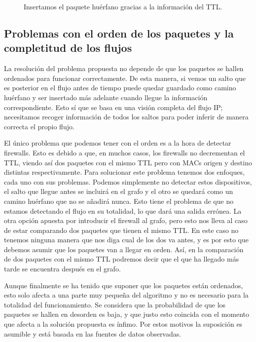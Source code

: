 \documentclass[twoside, 12pt]{epstfg}
\begin{document}
\begin{figure}[H]
\centering

\caption[Ejemplo de resolución de camino huérfano]{Insertamos el paquete huérfano gracias a la información del TTL.}
\label{fig:Analisis:OrphanPath}
\end{figure}

\subsection{Problemas con el orden de los paquetes y la completitud de los flujos}
La resolución del problema propuesta no depende de que los paquetes se hallen ordenados para funcionar correctamente. De esta manera, si vemos un salto que es posterior en el flujo antes de tiempo puede quedar guardado como camino huérfano y ser insertado más adelante cuando llegue la información correspondiente. Esto sí que se basa en una visión completa del flujo IP; necesitamos recoger información de todos los saltos para poder inferir de manera correcta el propio flujo.

El único problema que podemos tener con el orden es a la hora de detectar firewalls. Esto es debido a que, en muchos casos, los firewalls no decrementan el TTL, viendo así dos paquetes con el mismo TTL pero con MACs origen y destino distintas respectivamente. Para solucionar este problema tenemos dos enfoques, cada uno con sus problemas. Podemos simplemente no detectar estos dispositivos, el salto que llegue antes se incluirá en el grafo y el otro se quedará como un camino huérfano que no se añadirá nunca. Esto tiene el problema de que no estamos detectando el flujo en su totalidad, lo que dará una salida errónea. La otra opción apuesta por introducir el firewall al grafo, pero esto nos lleva al caso de estar comparando dos paquetes que tienen el mismo TTL. En este caso no tenemos ninguna manera que nos diga cual de los dos va antes, y es por esto que debemos asumir que los paquetes van a llegar en orden. Así, en la comparación de dos paquetes con el mismo TTL podremos decir que el que ha llegado más tarde se encuentra después en el grafo.

Aunque finalmente se ha tenido que suponer que los paquetes están ordenados, esto solo afecta a una parte muy pequeña del algoritmo y no es necesario para la totalidad del funcionamiento. Se considera que la probabilidad de que los paquetes se hallen en desorden es baja, y que justo esto coincida con el momento que afecta a la solución propuesta es ínfimo. Por estos motivos la suposición es asumible y está basada en las fuentes de datos observadas.
\end{document}
